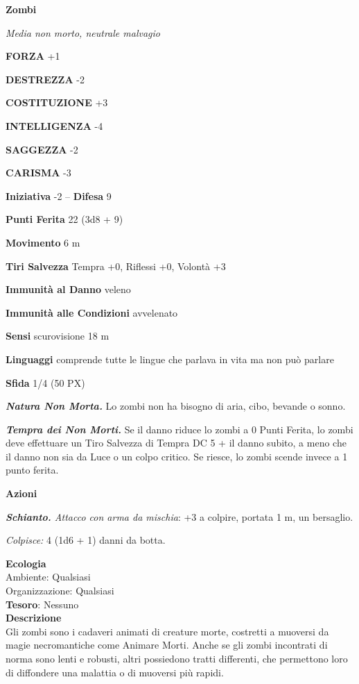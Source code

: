 \begin{multicols}{2}
	\medskip{}\textbf{Zombi}

	\textit{Media non morto, neutrale malvagio}

	\textbf{FORZA} +1

	\textbf{DESTREZZA} -2

	\textbf{COSTITUZIONE} +3

	\textbf{INTELLIGENZA} -4

	\textbf{SAGGEZZA} -2

	\textbf{CARISMA} -3

	\textbf{Iniziativa} -2 -- \textbf{Difesa} 9

	\textbf{Punti Ferita} 22 (3d8 + 9)

	\textbf{Movimento} 6 m

	\textbf{Tiri Salvezza} Tempra +0, Riflessi +0, Volontà +3

	\textbf{Immunità al Danno} veleno

	\textbf{Immunità alle Condizioni} avvelenato

	\textbf{Sensi} scurovisione 18 m

	\textbf{Linguaggi} comprende tutte le lingue che parlava in vita ma non può parlare

	\textbf{Sfida} 1/4 (50 PX)

	\textit{\textbf{Natura Non Morta.}} Lo zombi non ha bisogno di aria, cibo, bevande o sonno.

	\textit{\textbf{Tempra dei Non Morti.}} Se il danno riduce lo zombi a 0 Punti Ferita, lo zombi deve effettuare un Tiro Salvezza di Tempra DC 5 + il danno subito, a meno che il danno non sia da Luce o un colpo critico. Se riesce, lo zombi scende invece a 1 punto ferita.

	\textbf{Azioni}

	\textit{\textbf{Schianto.} Attacco con arma da mischia}: +3 a colpire, portata 1 m, un bersaglio.

	\textit{Colpisce:} 4 (1d6 + 1) danni da botta.

	\textbf{Ecologia}\\
	Ambiente: Qualsiasi\\
	Organizzazione: Qualsiasi\\
	\textbf{Tesoro}: Nessuno\\
	\textbf{Descrizione}\\
	Gli zombi sono i cadaveri animati di creature morte, costretti a muoversi da magie necromantiche come Animare Morti. Anche se gli zombi incontrati di norma sono lenti e robusti, altri possiedono tratti differenti, che permettono loro di diffondere una malattia o di muoversi più rapidi.


\end{multicols}
